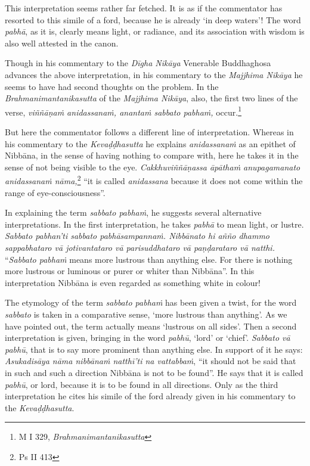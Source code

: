 This interpretation seems rather far fetched. It is as if the commentator has resorted to this simile of a ford, because he is already `in deep waters'! The word \emph{pabhā}, as it is, clearly means light, or radiance, and its association with wisdom is also well attested in the canon.

Though in his commentary to the \emph{Dīgha Nikāya} Venerable Buddhaghosa advances the above interpretation, in his commentary to the \emph{Majjhima Nikāya} he seems to have had second thoughts on the problem. In the \emph{Brahmanimantanikasutta} of the \emph{Majjhima Nikāya}, also, the first two lines of the verse, \emph{viññāṇaṁ anidassanaṁ, anantaṁ sabbato pabhaṁ,} occur.\footnote{M I 329, \emph{Brahmanimantanikasutta}}

But here the commentator follows a different line of interpretation. Whereas in his commentary to the \emph{Kevaḍḍhasutta} he explains \emph{anidassanaṁ} as an epithet of Nibbāna, in the sense of having nothing to compare with, here he takes it in the sense of not being visible to the eye. \emph{Cakkhuviññāṇassa āpāthaṁ anupagamanato anidassanaṁ nāma,}\footnote{Ps II 413} ``it is called \emph{anidassana} because it does not come within the range of eye-consciousness''.

In explaining the term \emph{sabbato pabhaṁ}, he suggests several alternative interpretations. In the first interpretation, he takes \emph{pabhā} to mean light, or lustre. \emph{Sabbato pabhan'ti sabbato pabhāsampannaṁ. Nibbānato hi añño dhammo sappabhataro vā jotivantataro vā parisuddhataro vā paṇḍarataro vā natthi.} ``\emph{Sabbato pabhaṁ} means more lustrous than anything else. For there is nothing more lustrous or luminous or purer or whiter than Nibbāna''. In this interpretation Nibbāna is even regarded as something white in colour!

The etymology of the term \emph{sabbato pabhaṁ} has been given a twist, for the word \emph{sabbato} is taken in a comparative sense, `more lustrous than anything'. As we have pointed out, the term actually means `lustrous on all sides'. Then a second interpretation is given, bringing in the word \emph{pabhū}, `lord' or `chief'. \emph{Sabbato vā pabhū}, that is to say more prominent than anything else. In support of it he says: \emph{Asukadisāya nāma nibbānaṁ natthī'ti na vattabbaṁ}, ``it should not be said that in such and such a direction Nibbāna is not to be found''. He says that it is called \emph{pabhū}, or lord, because it is to be found in all directions. Only as the third interpretation he cites his simile of the ford already given in his commentary to the \emph{Kevaḍḍhasutta}.

